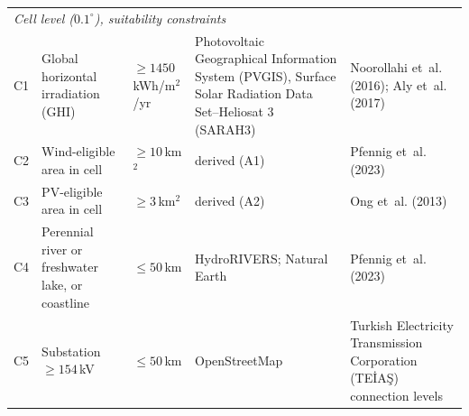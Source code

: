 \documentclass[11pt,a4paper]{article}
\begin{document}
\begin{table}[htbp]
{\begin{tabular}{llllp{5.2cm}}
\midrule
\multicolumn{5}{l}{\textit{Cell level ($0.1^\circ$), suitability constraints}} \\
C1 & Global horizontal irradiation (GHI) & $\ge 1450$\,kWh/m$^2$/yr & Photovoltaic Geographical Information System (PVGIS), Surface Solar Radiation Data Set--Heliosat 3 (SARAH3) & Noorollahi et~al. (2016); Aly et~al. (2017) \\
C2 & Wind-eligible area in cell & $\ge 10$\,km$^2$ & derived (A1) & Pfennig et~al. (2023) \\
C3 & PV-eligible area in cell & $\ge 3$\,km$^2$ & derived (A2) & Ong et~al. (2013) \\
C4 & Perennial river or freshwater lake, or coastline & $\le 50$\,km & HydroRIVERS; Natural Earth & Pfennig et~al. (2023) \\
C5 & Substation $\ge 154$\,kV & $\le 50$\,km & OpenStreetMap & Turkish Electricity Transmission Corporation (TEİAŞ) connection levels \\
\bottomrule
\end{tabular}%
}
\end{table}
\end{document}
